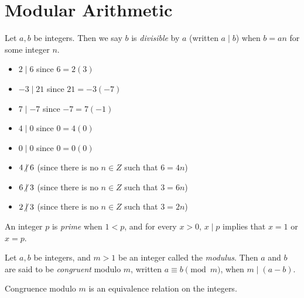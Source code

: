 \section{Modular Arithmetic}

\begin{defn}\label{divisible}
    Let $a, b$ be integers. Then we say $b$ is \emph{divisible} by $a$ (written $a \mid b$) when $b = an$ for some integer $n$.
\end{defn}

\begin{exmp}\proofbreak
    \begin{itemize}
        \item $2 \mid 6$ since $6 = 2(3)$
        \item $-3 \mid 21$ since $21 = -3(-7)$
        \item $7 \mid {-7}$ since $-7 = 7(-1)$
        \item $4 \mid 0$ since $0 = 4(0)$
        \item $0 \mid 0$ since $0 = 0(0)$
    \end{itemize}
\end{exmp}

\begin{exmp}\proofbreak
    \begin{itemize}
        \item $4 \centernot\mid 6$ (since there is no $n \in Z$ such that $6 = 4n$)
        \item $6 \centernot\mid 3$ (since there is no $n \in Z$ such that $3 = 6n$)
        \item $2 \centernot\mid 3$ (since there is no $n \in Z$ such that $3 = 2n$)
    \end{itemize}
\end{exmp}

\begin{defn}
    An integer $p$ is \emph{prime} when $1 < p$, and for every $x > 0$, $x \mid p$ implies that $x = 1$ or $x = p$.
\end{defn}

\begin{defn}\label{modular-congruence}
    Let $a, b$ be integers, and $m > 1$ be an integer called the \emph{modulus}. Then $a$ and $b$ are said to be \emph{congruent} modulo $m$, written $a \equiv b \pmod m$, when $m\mid(a - b)$.
\end{defn}

\begin{thm}\label{modular-congruence-equivalence}
    Congruence modulo $m$ is an equivalence relation on the integers.
\end{thm}

